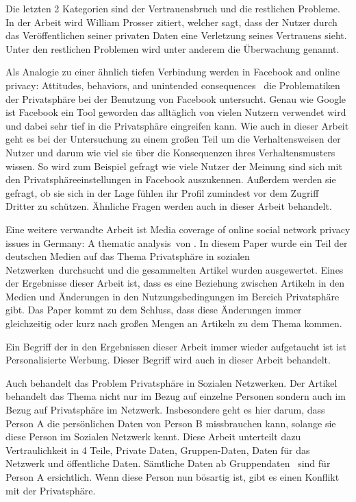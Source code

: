 Die letzten 2 Kategorien sind der Vertrauensbruch und die restlichen Probleme. In der Arbeit wird William Prosser zitiert, welcher sagt, dass der Nutzer durch das Veröffentlichen seiner privaten Daten eine Verletzung seines Vertrauens sieht. Unter den restlichen Problemen wird unter anderem die Überwachung genannt.

Als Analogie zu einer ähnlich tiefen Verbindung werden in \glqq Facebook and online privacy: Attitudes, behaviors, and unintended consequences\grqq\ \citet{debatin2009facebook} die Problematiken der Privatsphäre bei der Benutzung von Facebook untersucht. Genau wie Google ist Facebook ein Tool geworden das alltäglich von vielen Nutzern verwendet wird und dabei sehr tief in die Privatsphäre eingreifen kann. Wie auch in dieser Arbeit geht es bei der Untersuchung zu einem großen Teil um die Verhaltensweisen der Nutzer und darum wie viel sie über die Konsequenzen ihres Verhaltensmusters wissen. So wird zum Beispiel gefragt wie viele Nutzer der Meinung sind sich mit den Privatsphäreeinstellungen in Facebook auszukennen. Außerdem werden sie gefragt, ob sie sich in der Lage fühlen ihr Profil zumindest vor dem Zugriff Dritter zu schützen. Ähnliche Fragen werden auch in dieser Arbeit behandelt.

Eine weitere verwandte Arbeit ist \glqq Media coverage of online social network privacy issues in Germany: A thematic analysis\grqq\ von \citet{rizk2009media}. In diesem Paper wurde ein Teil der deutschen Medien auf das Thema \glqq Privatsphäre in sozialen Netzwerken\grqq\ durchsucht und die gesammelten Artikel wurden ausgewertet. Eines der Ergebnisse dieser Arbeit ist, dass es eine Beziehung zwischen Artikeln in den Medien und Änderungen in den Nutzungsbedingungen im Bereich Privatsphäre gibt. Das Paper kommt zu dem Schluss, dass diese Änderungen immer gleichzeitig oder kurz nach großen Mengen an Artikeln zu dem Thema kommen.

Ein Begriff der in den Ergebnissen dieser Arbeit immer wieder aufgetaucht ist ist \glqq Personalisierte Werbung\grqq . Dieser Begriff wird auch in dieser Arbeit behandelt.

Auch \citet{Preibusch2007Ubiquitous} behandelt das Problem Privatsphäre in Sozialen Netzwerken. Der Artikel behandelt das Thema nicht nur im Bezug auf einzelne Personen sondern auch im Bezug auf Privatsphäre im Netzwerk. Insbesondere geht es hier darum, dass Person A die persönlichen Daten von Person B missbrauchen kann, solange sie diese Person im Sozialen Netzwerk kennt. Diese Arbeit unterteilt dazu Vertraulichkeit in 4 Teile, Private Daten, Gruppen-Daten, Daten für das Netzwerk und öffentliche Daten. Sämtliche Daten ab \glqq Gruppendaten \grqq\ sind für Person A ersichtlich. Wenn diese Person nun bösartig ist, gibt es einen Konflikt mit der Privatsphäre. 

